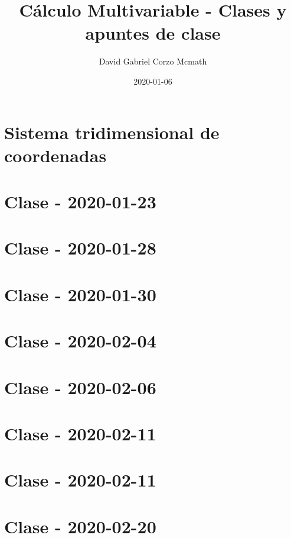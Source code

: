 \documentclass[openany]{book}
\title{Cálculo Multivariable - Clases y apuntes de clase}
\date{2020-01-06}
\author{David Gabriel Corzo Mcmath}
\begin{document}
\maketitle
\tableofcontents
\tikzblockdefinitions

\chapter{Sistema tridimensional de coordenadas}


\chapter{Clase - 2020-01-23}


\chapter{Clase - 2020-01-28}


\chapter{Clase - 2020-01-30}


\chapter{Clase - 2020-02-04}


\chapter{Clase - 2020-02-06}


\chapter{Clase - 2020-02-11}


\chapter{Clase - 2020-02-11}


\chapter{Clase - 2020-02-20}

\end{document}
